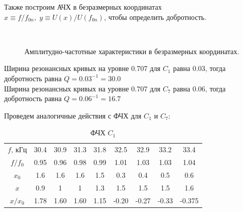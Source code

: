 \documentclass{physlab}
\begin{document}
Также построим АЧХ в безразмерных координатах $x\equiv f/f_{0n},\;y \equiv U(x)/U(f_{0n})$, чтобы определить добротность.
\begin{figure}[H]
	\begin{minipage}[H]{0.49\linewidth}
	\end{minipage}
	~
	\begin{minipage}[h]{0.49\linewidth}
	\end{minipage}
	\caption{Амплитудно-частотные характеристики в безразмерных координатах.}
	\label{ris:image3}
\end{figure}
Ширина резонансных кривых на уровне 0.707 для $C_1$ равна 0.03, тогда добротность равна $Q=0.03^{-1}=30.0$\\
Ширина резонансных кривых на уровне 0.707 для $C_7$ равна 0.06, тогда добротность равна $Q=0.06^{-1}=16.7$

Проведем аналогичные действия с ФЧХ для $C_1$ и $C_7$:

\begin{table}[H]
	\centering
	\caption{ФЧХ $C_1$}
	\label{table3.1}
	\begin{tabular}{c|c|c|c|c|c|c|c|c}
		\toprule
		$f$, кГц & 30.4 & 30.9 & 31.3 & 31.8 & 32.5 & 32.9 & 33.2 & 33.4 \\ 
		$f/f_0$ & 0.95 & 0.96 & 0.98  & 0.99  & 1.01 & 1.03 & 1.03 & 1.04 \\ 
		$x_0$ & 1.6 & 1.6 & 1.6 & 1.5 & 0.3 & 0.4 & 0.5 & 0.6 \\ 
		$x$ & 0.9 & 1 & 1 & 1.3 & 1.5 & 1.5 & 1.5 & 1.6 \\ 
		$x/x_0$ & 1.78 & 1.60 & 1.60 & 1.15 & -0.20 & -0.27 & -0.33 & -0.375 \\ \bottomrule
	\end{tabular}
\end{table}
\end{document}
